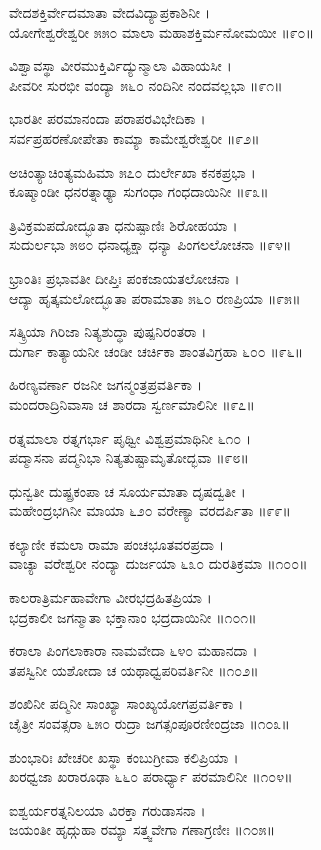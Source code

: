 ವೇದಶಕ್ತಿರ್ವೇದಮಾತಾ ವೇದವಿದ್ಯಾಪ್ರಕಾಶಿನೀ ।\\
ಯೋಗೇಶ್ವರೇಶ್ವರೀ ೫೫೦ ಮಾಲಾ ಮಹಾಶಕ್ತಿರ್ಮನೋಮಯೀ ॥೯೦॥

ವಿಶ್ವಾವಸ್ಥಾ ವೀರಮುಕ್ತಿರ್ವಿದ್ಯುನ್ಮಾಲಾ ವಿಹಾಯಸೀ ।\\
ಪೀವರೀ ಸುರಭೀ ವಂದ್ಯಾ ೫೬೦ ನಂದಿನೀ ನಂದವಲ್ಲಭಾ ॥೯೧॥

ಭಾರತೀ ಪರಮಾನಂದಾ ಪರಾಪರವಿಭೇದಿಕಾ ।\\
ಸರ್ವಪ್ರಹರಣೋಪೇತಾ ಕಾಮ್ಯಾ ಕಾಮೇಶ್ವರೇಶ್ವರೀ ॥೯೨॥

ಅಚಿಂತ್ಯಾಚಿಂತ್ಯಮಹಿಮಾ ೫೭೦ ದುರ್ಲೇಖಾ ಕನಕಪ್ರಭಾ ।\\
ಕೂಷ್ಮಾಂಡೀ ಧನರತ್ನಾಢ್ಯಾ ಸುಗಂಧಾ ಗಂಧದಾಯಿನೀ ॥೯೩॥

ತ್ರಿವಿಕ್ರಮಪದೋದ್ಭೂತಾ ಧನುಷ್ಪಾಣಿಃ ಶಿರೋಹಯಾ ।\\
ಸುದುರ್ಲಭಾ ೫೮೦ ಧನಾಧ್ಯಕ್ಷಾ ಧನ್ಯಾ ಪಿಂಗಲಲೋಚನಾ ॥೯೪॥

ಭ್ರಾಂತಿಃ ಪ್ರಭಾವತೀ ದೀಪ್ತಿಃ ಪಂಕಜಾಯತಲೋಚನಾ ।\\
ಆದ್ಯಾ ಹೃತ್ಕಮಲೋದ್ಭೂತಾ ಪರಾಮಾತಾ ೫೬೦ ರಣಪ್ರಿಯಾ ॥೯೫॥

ಸತ್ಕ್ರಿಯಾ ಗಿರಿಜಾ ನಿತ್ಯಶುದ್ಧಾ ಪುಷ್ಪನಿರಂತರಾ ।\\
ದುರ್ಗಾ ಕಾತ್ಯಾಯನೀ ಚಂಡೀ ಚರ್ಚಿಕಾ ಶಾಂತವಿಗ್ರಹಾ ೬೦೦ ॥೯೬॥

ಹಿರಣ್ಯವರ್ಣಾ ರಜನೀ ಜಗನ್ಮಂತ್ರಪ್ರವರ್ತಿಕಾ ।\\
ಮಂದರಾದ್ರಿನಿವಾಸಾ ಚ ಶಾರದಾ ಸ್ವರ್ಣಮಾಲಿನೀ ॥೯೭॥

ರತ್ನಮಾಲಾ ರತ್ನಗರ್ಭಾ ಪೃಥ್ವೀ ವಿಶ್ವಪ್ರಮಾಥಿನೀ ೬೧೦ ।\\
ಪದ್ಮಾಸನಾ ಪದ್ಮನಿಭಾ ನಿತ್ಯತುಷ್ಟಾಮೃತೋದ್ಭವಾ ॥೯೮॥

ಧುನ್ವತೀ ದುಷ್ಪ್ರಕಂಪಾ ಚ ಸೂರ್ಯಮಾತಾ ದೃಷದ್ವತೀ ।\\
ಮಹೇಂದ್ರಭಗಿನೀ ಮಾಯಾ ೬೨೦ ವರೇಣ್ಯಾ ವರದರ್ಪಿತಾ ॥೯೯॥

ಕಲ್ಯಾಣೀ ಕಮಲಾ ರಾಮಾ ಪಂಚಭೂತವರಪ್ರದಾ ।\\
ವಾಚ್ಯಾ ವರೇಶ್ವರೀ ನಂದ್ಯಾ ದುರ್ಜಯಾ ೬೩೦ ದುರತಿಕ್ರಮಾ ॥೧೦೦॥

ಕಾಲರಾತ್ರಿರ್ಮಹಾವೇಗಾ ವೀರಭದ್ರಹಿತಪ್ರಿಯಾ ।\\
ಭದ್ರಕಾಲೀ ಜಗನ್ಮಾತಾ ಭಕ್ತಾನಾಂ ಭದ್ರದಾಯಿನೀ ॥೧೦೧॥

ಕರಾಲಾ ಪಿಂಗಲಾಕಾರಾ ನಾಮವೇದಾ ೬೪೦ ಮಹಾನದಾ ।\\
ತಪಸ್ವಿನೀ ಯಶೋದಾ ಚ ಯಥಾಧ್ವಪರಿವರ್ತಿನೀ ॥೧೦೨॥

ಶಂಖಿನೀ ಪದ್ಮಿನೀ ಸಾಂಖ್ಯಾ ಸಾಂಖ್ಯಯೋಗಪ್ರವರ್ತಿಕಾ ।\\
ಚೈತ್ರೀ ಸಂವತ್ಸರಾ ೬೫೦ ರುದ್ರಾ ಜಗತ್ಸಂಪೂರಣೀಂದ್ರಜಾ ॥೧೦೩॥

ಶುಂಭಾರಿಃ ಖೇಚರೀ ಖಸ್ಥಾ ಕಂಬುಗ್ರೀವಾ ಕಲಿಪ್ರಿಯಾ ।\\
ಖರಧ್ವಜಾ ಖರಾರೂಢಾ ೬೬೦ ಪರಾರ್ಧ್ಯಾ ಪರಮಾಲಿನೀ ॥೧೦೪॥

ಐಶ್ವರ್ಯರತ್ನನಿಲಯಾ ವಿರಕ್ತಾ ಗರುಡಾಸನಾ ।\\
ಜಯಂತೀ ಹೃದ್ಗುಹಾ ರಮ್ಯಾ ಸತ್ತ್ವವೇಗಾ ಗಣಾಗ್ರಣೀಃ ॥೧೦೫॥

